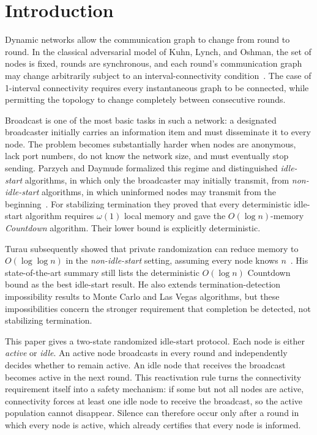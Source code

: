 \documentclass[11pt]{article}
\begin{document}
\section{Introduction}

Dynamic networks allow the communication graph to change from round to round. In the classical adversarial model of Kuhn, Lynch, and Oshman, the set of nodes is fixed, rounds are synchronous, and each round's communication graph may change arbitrarily subject to an interval-connectivity condition~\cite{KuhnLynchOshman2010}. The case of 1-interval connectivity requires every instantaneous graph to be connected, while permitting the topology to change completely between consecutive rounds.

Broadcast is one of the most basic tasks in such a network: a designated broadcaster initially carries an information item and must disseminate it to every node. The problem becomes substantially harder when nodes are anonymous, lack port numbers, do not know the network size, and must eventually stop sending. Parzych and Daymude formalized this regime and distinguished \emph{idle-start} algorithms, in which only the broadcaster may initially transmit, from \emph{non-idle-start} algorithms, in which uninformed nodes may transmit from the beginning~\cite{ParzychDaymude2024,ParzychDaymude2026}. For stabilizing termination they proved that every deterministic idle-start algorithm requires $\omega(1)$ local memory and gave the $O(\log n)$-memory \emph{Countdown} algorithm. Their lower bound is explicitly deterministic.

Turau subsequently showed that private randomization can reduce memory to $O(\log\log n)$ in the \emph{non-idle-start} setting, assuming every node knows $n$~\cite{Turau2026}. His state-of-the-art summary still lists the deterministic $O(\log n)$ Countdown bound as the best idle-start result. He also extends termination-detection impossibility results to Monte Carlo and Las Vegas algorithms, but these impossibilities concern the stronger requirement that completion be detected, not stabilizing termination.

This paper gives a two-state randomized idle-start protocol. Each node is either \emph{active} or \emph{idle}. An active node broadcasts in every round and independently decides whether to remain active. An idle node that receives the broadcast becomes active in the next round. This reactivation rule turns the connectivity requirement itself into a safety mechanism: if some but not all nodes are active, connectivity forces at least one idle node to receive the broadcast, so the active population cannot disappear. Silence can therefore occur only after a round in which every node is active, which already certifies that every node is informed.
\end{document}
